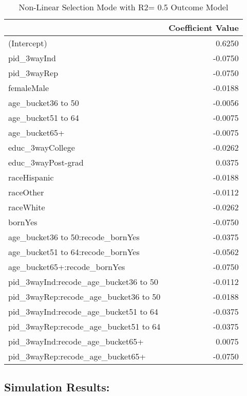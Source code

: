 \documentclass[
]{article}
\begin{document}
\begin{table}[!h]

\caption{\label{tab:r5_nonlin}Non-Linear Selection Mode with R2= 0.5 Outcome Model}
\centering
\begin{tabular}[t]{lr}
\toprule
  & Coefficient Value\\
\midrule
(Intercept) & 0.6250\\
pid\_3wayInd & -0.0750\\
pid\_3wayRep & -0.0750\\
femaleMale & -0.0188\\
age\_bucket36 to 50 & -0.0056\\
\addlinespace
age\_bucket51 to 64 & -0.0075\\
age\_bucket65+ & -0.0075\\
educ\_3wayCollege & -0.0262\\
educ\_3wayPost-grad & 0.0375\\
raceHispanic & -0.0188\\
\addlinespace
raceOther & -0.0112\\
raceWhite & -0.0262\\
bornYes & -0.0750\\
age\_bucket36 to 50:recode\_bornYes & -0.0375\\
age\_bucket51 to 64:recode\_bornYes & -0.0562\\
\addlinespace
age\_bucket65+:recode\_bornYes & -0.0750\\
pid\_3wayInd:recode\_age\_bucket36 to 50 & -0.0112\\
pid\_3wayRep:recode\_age\_bucket36 to 50 & -0.0188\\
pid\_3wayInd:recode\_age\_bucket51 to 64 & -0.0375\\
pid\_3wayRep:recode\_age\_bucket51 to 64 & -0.0375\\
\addlinespace
pid\_3wayInd:recode\_age\_bucket65+ & 0.0075\\
pid\_3wayRep:recode\_age\_bucket65+ & -0.0750\\
\bottomrule
\end{tabular}
\end{table}

\clearpage

\hypertarget{simulation-results}{%
\subsection{Simulation Results:}\label{simulation-results}}
\end{document}
